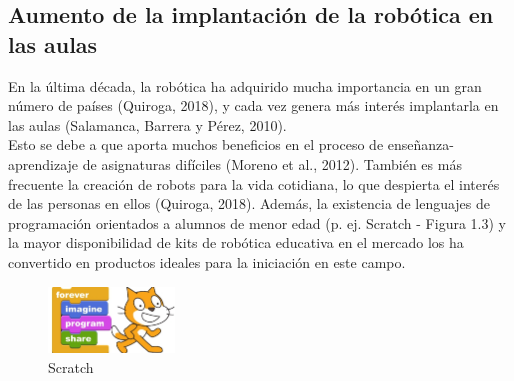 \documentclass{report}
\begin{document}
\subsection{Aumento de la implantación de la robótica en las aulas}

En la última década, la robótica ha adquirido mucha importancia en un gran número de países (Quiroga, 2018), y cada vez genera más interés implantarla en las aulas (Salamanca, Barrera y Pérez, 2010).
\\

Esto se debe a que aporta muchos beneficios en el proceso de enseñanza-aprendizaje de asignaturas difíciles (Moreno et al., 2012). También es más frecuente la creación de robots para la vida cotidiana, lo que despierta el interés de las personas en ellos (Quiroga, 2018). Además, la existencia de lenguajes de programación orientados a alumnos de menor edad (p. ej. Scratch - Figura 1.3) y la mayor disponibilidad de kits de robótica educativa en el mercado los ha convertido en productos ideales para la iniciación en este campo.
\\
\begin{figure}[h!]
  \centering
    \includegraphics[width=0.3\textwidth]{images/logo_scratch.png}
  \caption{Scratch}
  \label{Scratch}
\end{figure}
\\
\end{document}
